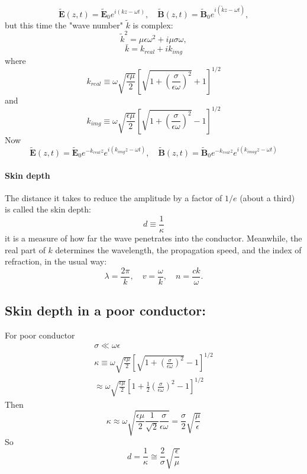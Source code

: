 $$
\tilde{\mathbf{E}}(z, t)=\tilde{\mathbf{E}}_{0} e^{i(k z-\omega t)}, \quad \tilde{\mathbf{B}}(z, t)=\tilde{\mathbf{B}}_{0} e^{i(\tilde{k} z-\omega t)},
$$
but this time the "wave number" $\tilde{k}$ is complex:
$$
\tilde{k}^{2}=\mu \epsilon \omega^{2}+i \mu \sigma \omega,
$$
$$\bar{k}=k_{real}+ik_{img}$$
where
$$
k_{real} \equiv \omega \sqrt{\frac{\epsilon \mu}{2}}\left[\sqrt{1+\left(\frac{\sigma}{\epsilon \omega}\right)^{2}}+1\right]^{1 / 2}
$$
and 
$$k_{img} \equiv \omega \sqrt{\frac{\epsilon \mu}{2}}\left[\sqrt{1+\left(\frac{\sigma}{\epsilon \omega}\right)^{2}}-1\right]^{1 / 2}$$
Now\\
$$\tilde{\mathbf{E}}(z, t)=\tilde{\mathbf{E}}_{0} e^{-k_{real} z} e^{i(k_{img} z-\omega t)}, \quad \tilde{\mathbf{B}}(z, t)=\tilde{\mathbf{B}}_{0} e^{-k_{real}z} e^{i(k_{imag} z-\omega t)}$$
\paragraph{Skin depth}
The distance it takes to reduce the amplitude by a factor of $1 / e$ (about a third) is called the skin depth:
$$
d \equiv \frac{1}{\kappa}
$$
it is a measure of how far the wave penetrates into the conductor. Meanwhile, the real part of $k$ determines the wavelength, the propagation speed, and the index of refraction, in the usual way:
$$
\lambda=\frac{2 \pi}{k}, \quad v=\frac{\omega}{k}, \quad n=\frac{c k}{\omega} .
$$
\subsection{ Skin depth in a poor conductor:}
For poor conductor
$$
\begin{gathered}
\sigma \ll \omega \epsilon \\
\kappa \equiv \omega \sqrt{\frac{\epsilon \mu}{2}}\left[\sqrt{1+\left(\frac{\sigma}{\epsilon \omega}\right)^{2}}-1\right]^{1 / 2} \\
\approx \omega \sqrt{\frac{\epsilon \mu}{2}}\left[1+\frac{1}{2}\left(\frac{\sigma}{\epsilon \omega}\right)^{2}-1\right]^{1 / 2}
\end{gathered}
$$
Then
$$
\kappa \approx \omega \sqrt{\frac{\epsilon \mu}{2} \frac{1}{\sqrt{2}} \frac{\sigma}{\epsilon \omega}}=\frac{\sigma}{2} \sqrt{\frac{\mu}{\epsilon}}
$$
So
$$
d=\frac{1}{\kappa} \cong \frac{2}{\sigma} \sqrt{\frac{\epsilon}{\mu}}
$$
